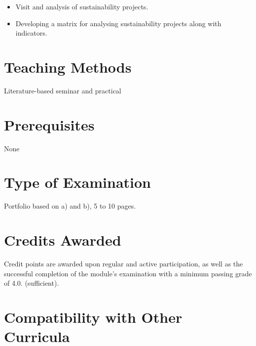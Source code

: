 \documentclass[
  letterpaper,
  10pt,
  openany]{book}
\providecommand{\tightlist}{%
  \setlength{\itemsep}{0pt}\setlength{\parskip}{0pt}}\usepackage{longtable,booktabs,array}
\begin{document}
\begin{itemize}
\tightlist
\item
  Visit and analysis of sustainability projects.
\item
  Developing a matrix for analysing sustainability projects along with
  indicators.
\end{itemize}

\section*{Teaching Methods}\label{teaching-methods-1}


Literature-based seminar and practical

\section*{Prerequisites}\label{prerequisites-1}


None

\section*{Type of Examination}\label{type-of-examination-1}


Portfolio based on a) and b), 5 to 10 pages.

\section*{Credits Awarded}\label{credits-awarded-1}


Credit points are awarded upon regular and active participation, as well
as the successful completion of the module's examination with a minimum
passing grade of 4.0. (sufficient).

\section*{Compatibility with Other
Curricula}\label{compatibility-with-other-curricula-1}
\end{document}
